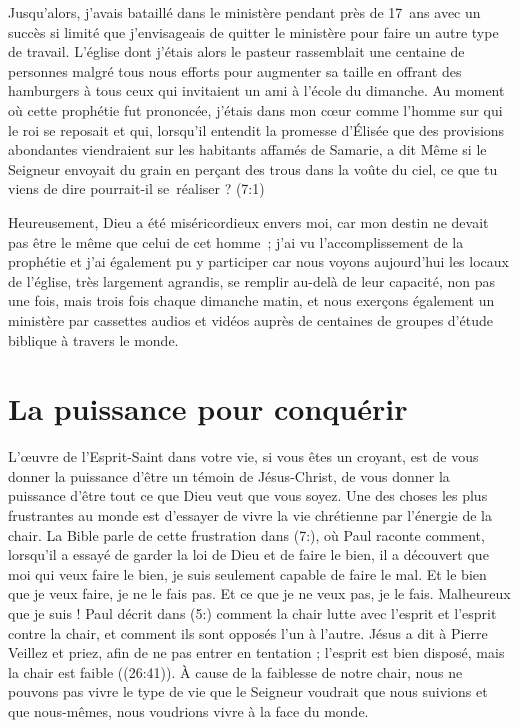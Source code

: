 Jusqu'alors, j'avais bataillé dans le ministère pendant près de 17~ans
 avec un succès si limité que j'envisageais de quitter le ministère
 pour faire un autre type de travail.
 L'église dont j'étais alors le pasteur rassemblait une centaine de personnes
 malgré tous nous efforts pour augmenter sa taille en offrant des hamburgers
 à tous ceux qui invitaient un ami à l'école du dimanche.
 Au moment où cette prophétie fut prononcée, j'étais dans mon cœur comme l'homme
 sur qui le roi se reposait et qui, lorsqu'il entendit la promesse d'Élisée
 que des provisions abondantes viendraient sur les habitants affamés
 de Samarie, a dit\frcolon{}
 \Og Même si le Seigneur envoyait du grain en perçant des trous dans
 la voûte du ciel, ce que tu viens de dire pourrait-il se~réaliser ? \Fg{}
 (7:1)

Heureusement, Dieu a été miséricordieux envers moi,
 car mon destin ne devait pas être le même que celui de cet homme~;
 j'ai vu l'ac\-com\-plis\-sement de la prophétie et j'ai également pu y participer
 car nous voyons aujourd'hui les locaux de l'église, très largement agrandis,
 se remplir au-delà de leur capacité, non pas une fois, mais trois fois
 chaque dimanche matin, et nous exerçons également un ministère
 par cassettes audios et vidéos auprès de centaines de groupes
 d'étude biblique à travers le monde.

\section{La puissance pour conqu\'erir}

L'œuvre de l'Esprit-Saint dans votre vie, si vous êtes un croyant,
 est de vous donner la puissance d'être un témoin de Jésus-Christ,
 de vous donner la puissance d'être tout ce que Dieu veut que vous soyez.
 Une des choses les plus frustrantes au monde est d'essayer
 de vivre la vie chrétienne par l'énergie de la chair.
 La Bible parle de cette frustration dans (7:),
 où Paul raconte comment, lors\-qu'il a essayé de garder la loi de Dieu
 et de faire le bien, il a découvert que \Og moi qui veux faire le bien,
 je suis seulement capable de faire le mal. Et le bien que je veux faire,
 je ne le fais pas. Et ce que je ne veux pas, je le fais.
 Malheureux que je suis ! \Fg{}
 Paul décrit dans (5:) comment la chair lutte avec l'esprit
 et l'esprit contre la chair, et comment ils sont opposés l'un à l'autre.
 Jésus a dit à Pierre\frcolon{}
 \Og Veillez et priez, afin de ne pas entrer en tentation ;
 l'esprit est bien disposé, mais la chair est faible \Fg{}
 ((26:41)).
 À cause de la faiblesse de notre chair, nous ne pouvons pas vivre
 le type de vie que le Seigneur voudrait que nous suivions
 et que nous-mêmes, nous voudrions vivre à la face du monde.

